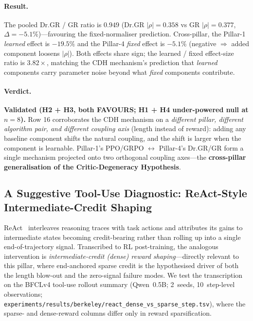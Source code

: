 \documentclass{article}
\begin{document}
\paragraph{Result.}
The pooled Dr.GR / GR ratio is $\mathbf{0.949}$ (Dr.GR
$|\rho|=0.358$ vs GR $|\rho|=0.377$, $\Delta=-5.1\%$)---favouring
the fixed-normaliser prediction. Cross-pillar, the Pillar-1
\emph{learned} effect is $-19.5\%$ and the Pillar-4 \emph{fixed}
effect is $-5.1\%$ (negative $\Rightarrow$ added component
loosens $|\rho|$). Both effects share sign; the learned / fixed
effect-size ratio is $\mathbf{3.82\times}$, matching the CDH
mechanism's prediction that \emph{learned} components carry
parameter noise beyond what \emph{fixed} components contribute.

\paragraph{Verdict.}
\textbf{Validated (H2 + H3, both FAVOURS; H1 + H4 under-powered
null at $n=8$).} Row 16 corroborates the CDH mechanism on a
\emph{different pillar, different algorithm pair, and different
coupling axis} (length instead of reward): adding any baseline
component shifts the natural coupling, and the shift is larger
when the component is learnable. Pillar-1's
PPO/GRPO $\leftrightarrow$ Pillar-4's Dr.GR/GR form a single
mechanism projected onto two orthogonal coupling axes---the
\textbf{cross-pillar generalisation of the Critic-Degeneracy
Hypothesis}.
 

\subsection{A Suggestive Tool-Use Diagnostic: ReAct-Style Intermediate-Credit Shaping}
\label{sec:length-bias-react-shaping}

ReAct~\citep{yao2023react} interleaves reasoning traces with
task actions and attributes its gains to intermediate states
becoming credit-bearing rather than rolling up into a single
end-of-trajectory signal. Transcribed to RL post-training, the
analogous intervention is \emph{intermediate-credit (dense)
reward shaping}---directly relevant to this pillar, where
end-anchored sparse credit is the hypothesised driver of both
the length blow-out and the zero-signal failure modes. We test
the transcription on the BFCLv4 tool-use rollout summary
(Qwen~0.5B; 2~seeds, 10~step-level observations;
\texttt{experiments/results/berkeley/react\_dense\_vs\_sparse\_step.tsv}),
where the sparse- and dense-reward columns differ only in reward
sparsification.
\end{document}
